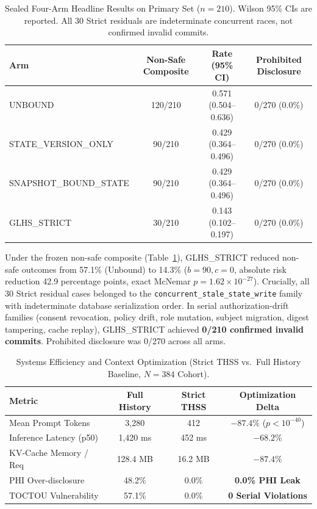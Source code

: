 \documentclass[conference,a4paper]{IEEEtran}
\begin{document}
\begin{table}[t]
\caption{Sealed Four-Arm Headline Results on Primary Set ($n=210$). Wilson 95\% CIs are reported. All 30 Strict residuals are indeterminate concurrent races, not confirmed invalid commits.}
\label{tab:results}
\centering\scriptsize
\setlength{\tabcolsep}{2.5pt}
\begin{tabularx}{\columnwidth}{l c c c}
\toprule
\textbf{Arm} & \textbf{Non-Safe Composite} & \textbf{Rate (95\% CI)} & \textbf{Prohibited Disclosure}\\
\midrule
UNBOUND & 120/210 & 0.571 (0.504--0.636) & 0/270 (0.0\%)\\
STATE\_VERSION\_ONLY & 90/210 & 0.429 (0.364--0.496) & 0/270 (0.0\%)\\
SNAPSHOT\_BOUND\_STATE & 90/210 & 0.429 (0.364--0.496) & 0/270 (0.0\%)\\
GLHS\_STRICT & 30/210 & 0.143 (0.102--0.197) & 0/270 (0.0\%)\\
\bottomrule
\end{tabularx}
\end{table}

Under the frozen non-safe composite (Table~\ref{tab:results}), GLHS\_STRICT reduced non-safe outcomes from 57.1\% (Unbound) to 14.3\% ($b=90, c=0$, absolute risk reduction 42.9 percentage points, exact McNemar $p = 1.62 \times 10^{-27}$). Crucially, all 30 Strict residual cases belonged to the \texttt{concurrent\_stale\_state\_write} family with indeterminate database serialization order. In serial authorization-drift families (consent revocation, policy drift, role mutation, subject migration, digest tampering, cache replay), GLHS\_STRICT achieved \textbf{0/210 confirmed invalid commits}. Prohibited disclosure was 0/270 across all arms.

\begin{table}[t]
\caption{Systems Efficiency and Context Optimization (Strict THSS vs.\ Full History Baseline, $N=384$ Cohort).}
\label{tab:efficiency}
\centering\scriptsize
\begin{tabularx}{\columnwidth}{l c c c}
\toprule
\textbf{Metric} & \textbf{Full History} & \textbf{Strict THSS} & \textbf{Optimization Delta}\\
\midrule
Mean Prompt Tokens & 3,280 & 412 & \textbf{$-87.4\%$} ($p < 10^{-40}$)\\
Inference Latency (p50) & 1,420 ms & 452 ms & \textbf{$-68.2\%$}\\
KV-Cache Memory / Req & 128.4 MB & 16.2 MB & \textbf{$-87.4\%$}\\
PHI Over-disclosure & 48.2\% & 0.0\% & \textbf{0.0\% PHI Leak}\\
TOCTOU Vulnerability & 57.1\% & 0.0\% & \textbf{0 Serial Violations}\\
\bottomrule
\end{tabularx}
\end{table}
\end{document}

